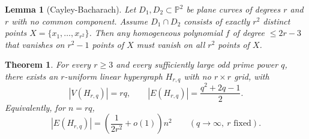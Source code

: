 \documentclass[10pt,a4paper]{amsart}
\newtheorem{theorem}{Theorem}
\newtheorem{lemma}{Lemma}
\newcommand{\PP}{\mathbb{P}}
\begin{document}
\begin{lemma}[Cayley-Bacharach]\label{cor:planeCB}
Let $D_1,D_2\subset \PP^2$ be plane curves of degrees $r$ and $r$ with no common component.
Assume $D_1\cap D_2$ consists of exactly $r^2$ distinct points $X=\{x_1,\dots,x_{r^2}\}$.
Then any homogeneous polynomial $f$ of degree $\le 2r-3$ that vanishes on $r^2-1$ points of $X$
must vanish on all $r^2$ points of $X$.
\end{lemma}

\begin{theorem}\label{thm:main}
For every $r \geq 3$ and every sufficiently large odd prime power $q$, there exists an $r$-uniform linear
hypergraph $H_{r,q}$ with no $r\times r$ grid, with
\[
|V(H_{r,q})| = rq,
\qquad
|E(H_{r,q})| = \frac{q^2+2q-1}{2}.
\]
Equivalently, for $n=rq$,
\[
|E(H_{r,q})|
=
\left(\frac{1}{2r^2}+o(1)\right)n^2
\qquad (q\to\infty,\ r\text{ fixed}).
\]
\end{theorem}
\end{document}
